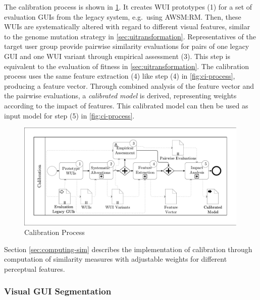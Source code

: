 The calibration process is shown in \cref{fig:ci-calibration}.
It creates WUI prototypes (1) for a set of evaluation GUIs from the legacy system, e.g.~using AWSM:RM.
Then, these WUIs are systematically altered with regard to different visual features, similar to the genome mutation strategy in \cref{sec:uitransformation}.
Representatives of the target user group provide pairwise similarity evaluations for pairs of one legacy GUI and one WUI variant through empirical assessment (3).
This step is equivalent to the evaluation of fitness in \cref{sec:uitransformation}.
The calibration process uses the same feature extraction (4) like step (4) in \cref{fig:ci-process}, producing a feature vector.
Through combined analysis of the feature vector and the pairwise evaluations, a \emph{calibrated model} is derived, representing weights according to the impact of features.
This calibrated model can then be used as input model for step (5) in \cref{fig:ci-process}.

\begin{figure}
\hypertarget{fig:ci-calibration}{%
\centering
\includegraphics[width=0.99\textwidth]{../figures/awsm-ci-calibration.pdf}
\caption{Calibration Process}\label{fig:ci-calibration}
}
\end{figure}

Section \cref{sec:computing-sim} describes the implementation of calibration through computation of similarity measures with adjustable weights for different perceptual features.

\hypertarget{sec:segmentation}{%
\subsubsection{Visual GUI Segmentation}\label{sec:segmentation}}


